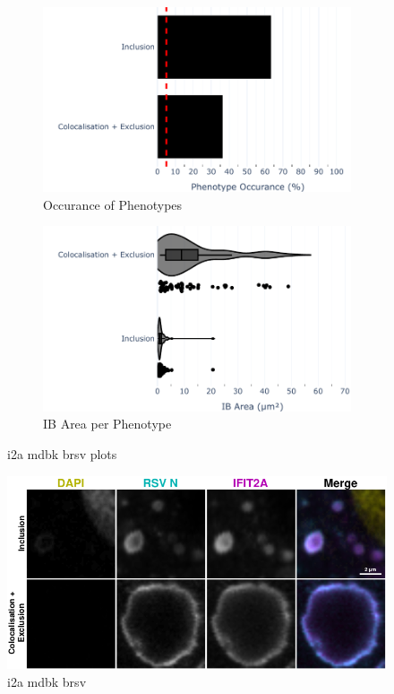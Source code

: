 \begin{figure}
    \begin{subfigure}{0.5\textwidth}
        \includegraphics[width=1\linewidth]{10. Chapter 5/Figs/01. Infection/01. IFIT2A/13. bar_i2a_mdbk.pdf} 
        \caption[]{Occurance of Phenotypes}
    \end{subfigure}
    \begin{subfigure}{0.5\textwidth}
        \includegraphics[width=1\linewidth]{10. Chapter 5/Figs/01. Infection/01. IFIT2A/14. violin_i2a_mdbk.pdf}
        \caption[]{IB Area per Phenotype}
    \end{subfigure}
    \caption[i2a mdbk brsv plots]{i2a mdbk brsv plots}
    \label{fig:i2a mdbk brsv plots}
\end{figure}

\begin{figure}
    \centering
    \includegraphics[width=1\linewidth]{10. Chapter 5/Figs/01. Infection/01. IFIT2A/15. i2a mdbk brsv.pdf}
    \caption[i2a mdbk brsv]{i2a mdbk brsv}
    \label{fig:i2a mdbk brsv}
\end{figure}

